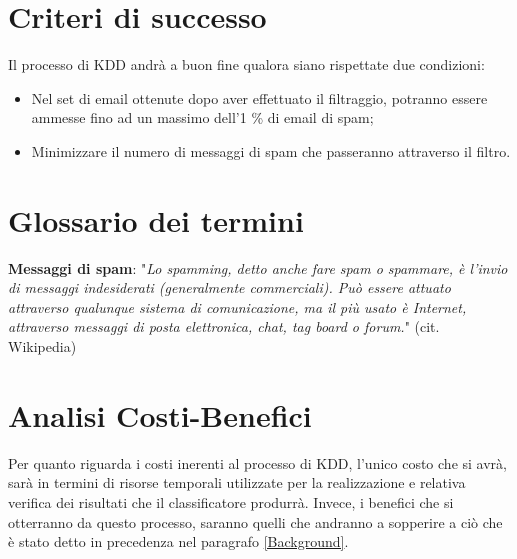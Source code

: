 \section{Criteri di successo}
	Il processo di KDD andrà a buon fine qualora siano rispettate due condizioni:
	\begin{itemize}
		\item 	Nel set di email ottenute dopo aver effettuato il filtraggio, potranno essere ammesse fino ad un massimo dell'1 \% di email di spam;
		\item	Minimizzare il numero di messaggi di spam che passeranno attraverso il filtro.
	\end{itemize}

\section{Glossario dei termini}
\textbf{Messaggi di spam}: "\textit{Lo spamming, detto anche fare spam o spammare, è l'invio di messaggi indesiderati (generalmente commerciali). Può essere attuato attraverso qualunque sistema di comunicazione, ma il più usato è Internet, attraverso messaggi di posta elettronica, chat, tag board o forum.}" (cit. Wikipedia)\cite{wiki:Spam}

\section{Analisi Costi-Benefici}
Per quanto riguarda i costi inerenti al processo di KDD, l'unico costo che si avrà, sarà in termini di risorse temporali utilizzate per la realizzazione e relativa verifica dei risultati che il classificatore produrrà.
Invece, i benefici che si otterranno da questo processo, saranno quelli che andranno a sopperire a ciò che è stato detto in precedenza nel paragrafo \ref{Background}.

